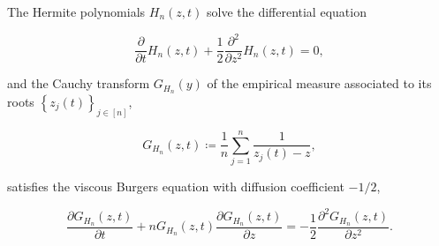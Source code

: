 \begin{theorem} \label{thm:heat_burgers}
    The Hermite polynomials $H_n(z,t)$ solve the differential equation

    \begin{equation} \label{eq:calor}
        \frac{\partial}{\partial t} H_n(z,t) + \frac12 \frac{\partial^2}{\partial z^2} H_n(z,t) = 0,
    \end{equation}

    \noindent and the Cauchy transform $G_{H_n}(y)$ of the empirical measure associated to its roots $\left\{ z_j(t) \right\}_{j\in [n]}$, 
    
    \begin{equation*}
        G_{H_n}(z,t) \coloneqq \frac1n \sum_{j=1}^n \frac{1}{z_j(t) - z},
    \end{equation*}

    \noindent satisfies the viscous Burgers equation with diffusion coefficient $-1/2$,

    \begin{equation*} \label{eq:burgers_12}
        \frac{\partial G_{H_n}(z,t)}{\partial t} + nG_{H_n}(z,t)\frac{\partial G_{H_n}(z,t)}{\partial z} = -\frac12 \frac{\partial^2 G_{H_n}(z,t)}{\partial z^2}.
    \end{equation*}
    
\end{theorem}

